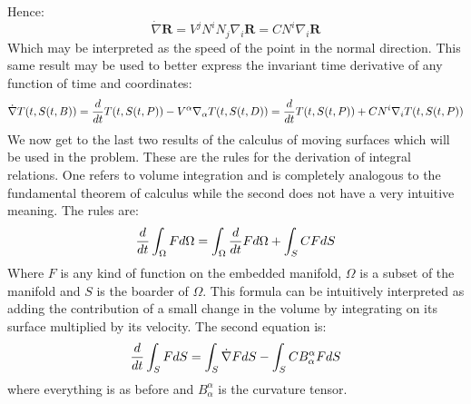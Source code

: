 \documentclass[../main.tex]{subfiles}
\begin{document}
        Hence:
        \begin{equation}
            \dot{\nabla}\mathbf{R}=V^jN^iN_j\nabla_i\mathbf{R}=CN^i\nabla_i\mathbf{R}
        \end{equation}
        Which may be interpreted as the speed of the point in the normal direction. This same result may be used to better express the invariant time derivative of any function of time and coordinates:
        \begin{equation}
        \dot{\nabla}T(t,S(t,B))=\dfrac{d}{dt}T(t,S(t,P))-V^\alpha\nabla_\alpha T(t,S(t,D))=\dfrac{d}{dt}T(t,S(t,P))+CN^i\nabla_iT(t,S(t,P))
        \end{equation}
        We now get to the last two results of the calculus of moving surfaces which will be used in the problem. These are the rules for the derivation of integral relations. One refers to volume integration and is completely analogous to the fundamental theorem of calculus while the second does not have a very intuitive meaning. The rules are:
        \begin{equation}
	        \label{eqn:intex1}
            \dfrac{d}{dt}\int_\Omega Fd\Omega = \int_\Omega \dfrac{d}{dt}Fd\Omega + \int_SCFdS
        \end{equation}
        Where $F$ is any kind of function on the embedded manifold, $\Omega $ is a subset of the manifold and $S$ is the boarder of $\Omega$. This formula can be intuitively interpreted as adding the contribution of a small change in the volume by integrating on its surface multiplied by its velocity. The second equation is:
        \begin{equation}
            \dfrac{d}{dt}\int_SFdS=\int_S \dot{\nabla}FdS-\int_SCB_\alpha^\alpha FdS
        \end{equation}
        where everything is as before and $B_\alpha^\alpha$ is the curvature tensor.
\end{document}
